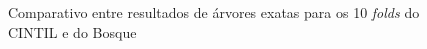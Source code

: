 \begin{figure}[!ht]
    \centering
    
    \caption[Comparativo entre árvores exatas]{Comparativo entre resultados de árvores exatas para os 10 \textit{folds} do CINTIL e do Bosque}
    \label{fig:comp_exatas_cintil_bosque}
\end{figure}